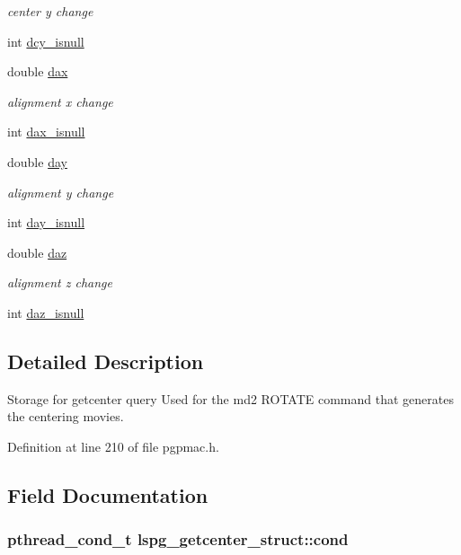 \begin{DoxyCompactItemize}
\begin{DoxyCompactList}\small\item\em center y change \end{DoxyCompactList}\item 
int \hyperlink{structlspg__getcenter__struct_a352c48c8d443c52f18ebd13019d01684}{dcy\-\_\-isnull}
\item 
double \hyperlink{structlspg__getcenter__struct_a17db52848c28852a470222ec93ae8886}{dax}
\begin{DoxyCompactList}\small\item\em alignment x change \end{DoxyCompactList}\item 
int \hyperlink{structlspg__getcenter__struct_a621b489777d61e9db8b33b784b8d70f9}{dax\-\_\-isnull}
\item 
double \hyperlink{structlspg__getcenter__struct_a9ce0f29540f2ff47be9788565d19f1b8}{day}
\begin{DoxyCompactList}\small\item\em alignment y change \end{DoxyCompactList}\item 
int \hyperlink{structlspg__getcenter__struct_a36f57a319288810caf365cca7827ff96}{day\-\_\-isnull}
\item 
double \hyperlink{structlspg__getcenter__struct_a1170bab2161f03ab29c39f79519ed9ae}{daz}
\begin{DoxyCompactList}\small\item\em alignment z change \end{DoxyCompactList}\item 
int \hyperlink{structlspg__getcenter__struct_a36742b6bd0f4bf9356414930ba893617}{daz\-\_\-isnull}
\end{DoxyCompactItemize}


\subsection{Detailed Description}
Storage for getcenter query Used for the md2 R\-O\-T\-A\-T\-E command that generates the centering movies. 

Definition at line 210 of file pgpmac.\-h.



\subsection{Field Documentation}
\hypertarget{structlspg__getcenter__struct_ae0db0ff2608ab5ba3e7c1b4ad3fc0e91}{
\subsubsection[{cond}]{\setlength{\rightskip}{0pt plus 5cm}pthread\-\_\-cond\-\_\-t lspg\-\_\-getcenter\-\_\-struct\-::cond}}\label{structlspg__getcenter__struct_ae0db0ff2608ab5ba3e7c1b4ad3fc0e91}



